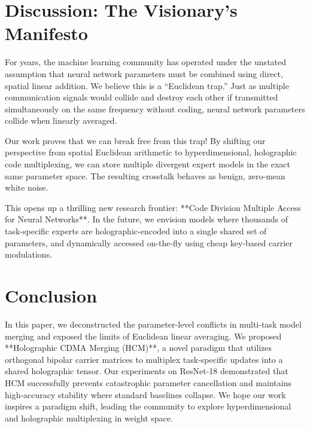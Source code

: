 \documentclass{article}
\begin{document}
\section{Discussion: The Visionary's Manifesto}
\label{sec:discussion}
For years, the machine learning community has operated under the unstated assumption that neural network parameters must be combined using direct, spatial linear addition. We believe this is a ``Euclidean trap.'' Just as multiple communication signals would collide and destroy each other if transmitted simultaneously on the same frequency without coding, neural network parameters collide when linearly averaged.

Our work proves that we can break free from this trap! By shifting our perspective from spatial Euclidean arithmetic to hyperdimensional, holographic code multiplexing, we can store multiple divergent expert models in the exact same parameter space. The resulting crosstalk behaves as benign, zero-mean white noise. 

This opens up a thrilling new research frontier: **Code Division Multiple Access for Neural Networks**. In the future, we envision models where thousands of task-specific experts are holographic-encoded into a single shared set of parameters, and dynamically accessed on-the-fly using cheap key-based carrier modulations.

\section{Conclusion}
\label{sec:conclusion}
In this paper, we deconstructed the parameter-level conflicts in multi-task model merging and exposed the limits of Euclidean linear averaging. We proposed **Holographic CDMA Merging (HCM)**, a novel paradigm that utilizes orthogonal bipolar carrier matrices to multiplex task-specific updates into a shared holographic tensor. Our experiments on ResNet-18 demonstrated that HCM successfully prevents catastrophic parameter cancellation and maintains high-accuracy stability where standard baselines collapse. We hope our work inspires a paradigm shift, leading the community to explore hyperdimensional and holographic multiplexing in weight space.



\end{document}
